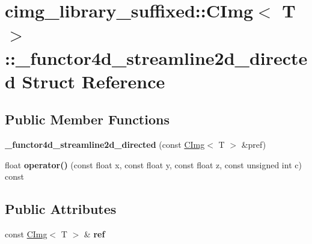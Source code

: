 \hypertarget{structcimg__library__suffixed_1_1CImg_1_1__functor4d__streamline2d__directed}{}\section{cimg\+\_\+library\+\_\+suffixed\+:\+:C\+Img$<$ T $>$\+:\+:\+\_\+functor4d\+\_\+streamline2d\+\_\+directed Struct Reference}
\label{structcimg__library__suffixed_1_1CImg_1_1__functor4d__streamline2d__directed}
\subsection*{Public Member Functions}
\begin{DoxyCompactItemize}
\item 
\mbox{\label{structcimg__library__suffixed_1_1CImg_1_1__functor4d__streamline2d__directed_a1f75ad71877ddbcd7ae34cac3ed1145c}} 
{\bfseries \+\_\+functor4d\+\_\+streamline2d\+\_\+directed} (const \hyperlink{structcimg__library__suffixed_1_1CImg}{C\+Img}$<$ T $>$ \&pref)
\item 
\mbox{\label{structcimg__library__suffixed_1_1CImg_1_1__functor4d__streamline2d__directed_a76002cc085d76e1d4e1f24e151849790}} 
float {\bfseries operator()} (const float x, const float y, const float z, const unsigned int c) const
\end{DoxyCompactItemize}
\subsection*{Public Attributes}
\begin{DoxyCompactItemize}
\item 
\mbox{\label{structcimg__library__suffixed_1_1CImg_1_1__functor4d__streamline2d__directed_a83088592588a54fe8db896605d614fe0}} 
const \hyperlink{structcimg__library__suffixed_1_1CImg}{C\+Img}$<$ T $>$ \& {\bfseries ref}
\end{DoxyCompactItemize}


